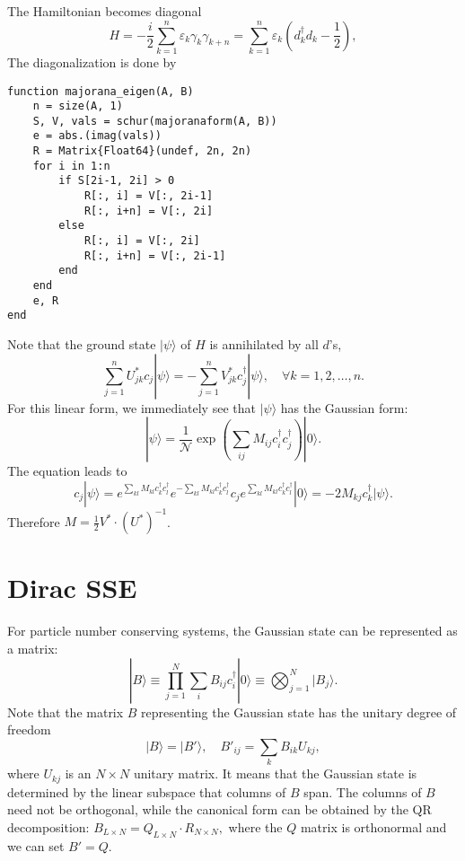 \documentclass{SciPost}
\begin{document}
The Hamiltonian becomes diagonal
\begin{equation}
	H = -\frac{i}{2} \sum_{k=1}^n \varepsilon_k \gamma_k\gamma_{k+n}
	= \sum_{k=1}^n \varepsilon_k \left(d_k^\dagger d_k -\frac{1}{2}\right),
\end{equation}
The diagonalization is done by
\begin{lstlisting}
function majorana_eigen(A, B)
	n = size(A, 1)
	S, V, vals = schur(majoranaform(A, B))
	e = abs.(imag(vals))
	R = Matrix{Float64}(undef, 2n, 2n)
	for i in 1:n
		if S[2i-1, 2i] > 0
			R[:, i] = V[:, 2i-1]
			R[:, i+n] = V[:, 2i]
		else
			R[:, i] = V[:, 2i]
			R[:, i+n] = V[:, 2i-1]
		end
	end
	e, R
end	
\end{lstlisting}
Note that the ground state $|\psi\rangle$ of $H$ is annihilated by all $d$'s, 
\begin{equation}
	\sum_{j=1}^n U_{jk}^* c_j|\psi\rangle = - \sum_{j=1}^n V_{jk}^* c_j^\dagger|\psi\rangle, \quad\forall k =1,2,\dots,n.
\end{equation}
For this linear form, we immediately see that $|\psi\rangle$ has the Gaussian form:
\begin{equation}
	|\psi\rangle = \frac{1}{\mathcal N} \exp\left(\sum_{ij}M_{ij}c_i^\dagger c_j^\dagger\right)|0\rangle.
\end{equation}
The equation leads to
\begin{equation*}
	c_j |\psi\rangle = e^{\sum_{kl}M_{kl}c_k^\dagger c_l^\dagger} e^{-\sum_{kl}M_{kl}c_k^\dagger c_l^\dagger} c_j e^{\sum_{kl}M_{kl}c_k^\dagger c_l^\dagger} |0\rangle 
	= -2 M_{kj} c_k^\dagger|\psi\rangle.
\end{equation*}
Therefore $M = \frac{1}{2} V^* \cdot (U^*)^{-1}$.




\section{Dirac SSE}

For particle number conserving systems, the Gaussian state can be represented as a matrix: 
\begin{equation}
	|B\rangle \equiv \prod_{j=1}^N \sum_i B_{ij} c_{i}^\dagger |0\rangle 
	\equiv \bigotimes_{j=1}^N |B_j\rangle.
\end{equation}
Note that the matrix $B$ representing the Gaussian state has the unitary degree of freedom
$$|B\rangle = |B'\rangle, \quad B'_{ij} = \sum_k B_{ik}U_{kj},$$
where $U_{kj}$ is an $N\times N$ unitary matrix. It means that the Gaussian state is determined by the linear subspace that columns of $B$ span. The columns of $B$ need not be orthogonal, while the canonical form can be obtained by the QR decomposition: $B_{L\times N} = Q_{L\times N} \cdot R_{N\times N},$ where the $Q$ matrix is orthonormal and we can set $B' = Q$.
\end{document}
